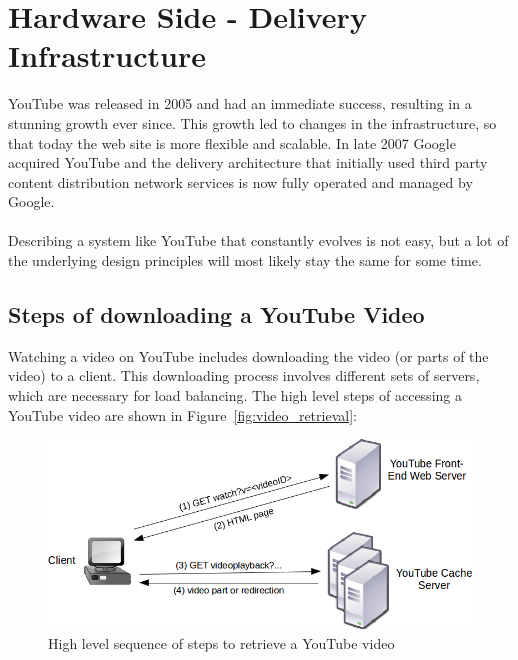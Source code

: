 \section{Hardware Side - Delivery Infrastructure}
\label{chp:hardware_side}

YouTube was released in 2005 and had an immediate success, resulting in a stunning growth ever since. This growth led to changes in the infrastructure, so that today the web site is more flexible and scalable. In late 2007 Google acquired YouTube and the delivery architecture that initially used third party content distribution network services is now fully operated and managed by Google.
\\
\\
Describing a system like YouTube that constantly evolves is not easy, but a lot of the underlying design principles will most likely stay the same for some time.

\subsection{Steps of downloading a YouTube Video}

Watching a video on YouTube includes downloading the video (or parts of the video) to a client. This downloading process involves different sets of servers, which are necessary for load balancing. The high level steps of accessing a YouTube video are shown in Figure~\vref{fig:video_retrieval}:

\begin{figure}[htbp]
  \begin{center}
    \includegraphics[width=\textwidth]{pictures/video_retrieval.png}
    \caption{High level sequence of steps to retrieve a YouTube video}
    \label{fig:video_retrieval}
  \end{center}
\end{figure}

